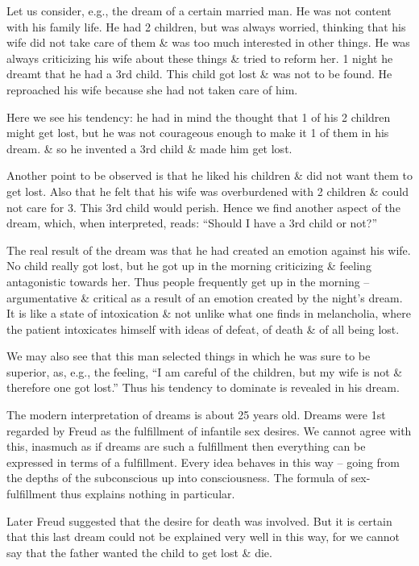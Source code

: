 \documentclass{article}
\begin{document}
Let us consider, e.g., the dream of a certain married man. He was not content with his family life. He had 2 children, but was always worried, thinking that his wife did not take care of them \& was too much interested in other things. He was always criticizing his wife about these things \& tried to reform her. 1 night he dreamt that he had a 3rd child. This child got lost \& was not to be found. He reproached his wife because she had not taken care of him.

Here we see his tendency: he had in mind the thought that 1 of his 2 children might get lost, but he was not courageous enough to make it 1 of them in his dream. \& so he invented a 3rd child \& made him get lost.

Another point to be observed is that he liked his children \& did not want them to get lost. Also that he felt that his wife was overburdened with 2 children \& could not care for 3. This 3rd child would perish. Hence we find another aspect of the dream, which, when interpreted, reads: ``Should I have a 3rd child or not?''

The real result of the dream was that he had created an emotion against his wife. No child really got lost, but he got up in the morning criticizing \& feeling antagonistic towards her. Thus people frequently get up in the morning -- argumentative \& critical as a result of an emotion created by the night's dream. It is like a state of intoxication \& not unlike what one finds in melancholia, where the patient intoxicates himself with ideas of defeat, of death \& of all being lost.

We may also see that this man selected things in which he was sure to be superior, as, e.g., the feeling, ``I am careful of the children, but my wife is not \& therefore one got lost.'' Thus his tendency to dominate is revealed in his dream.

The modern interpretation of dreams is about 25 years old. Dreams were 1st regarded by Freud as the fulfillment of infantile sex desires. We cannot agree with this, inasmuch as if dreams are such a fulfillment then everything can be expressed in terms of a fulfillment. Every idea behaves in this way -- going from the depths of the subconscious up into consciousness. The formula of sex-fulfillment thus explains nothing in particular.

Later Freud suggested that the desire for death was involved. But it is certain that this last dream could not be explained very well in this way, for we cannot say that the father wanted the child to get lost \& die.
\end{document}

